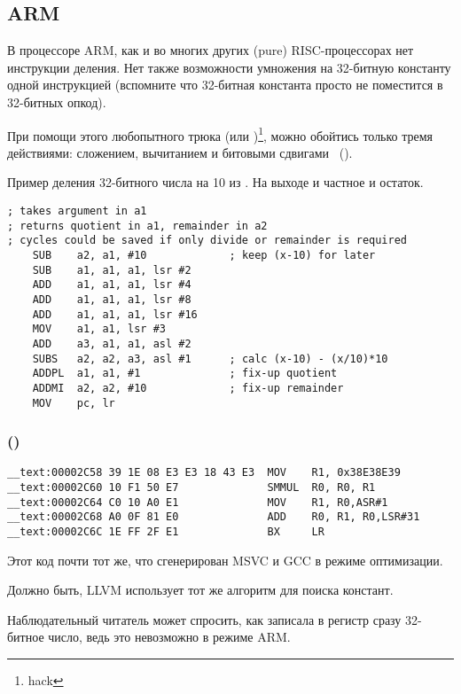 ﻿\subsection{ARM}

В процессоре ARM, как и во многих других  (pure) RISC-процессорах нет инструкции деления.
Нет также возможности умножения на 32-битную константу одной инструкцией (вспомните что 32-битная
константа просто не поместится в 32-битных опкод).

При помощи этого любопытного трюка (или )\footnote{hack}, можно обойтись только тремя действиями: 
сложением, вычитанием и битовыми сдвигами
~().

Пример деления 32-битного числа на 10 из
.
На выходе и частное и остаток.

\begin{lstlisting}[style=customasm]
; takes argument in a1
; returns quotient in a1, remainder in a2
; cycles could be saved if only divide or remainder is required
    SUB    a2, a1, #10             ; keep (x-10) for later
    SUB    a1, a1, a1, lsr #2
    ADD    a1, a1, a1, lsr #4
    ADD    a1, a1, a1, lsr #8
    ADD    a1, a1, a1, lsr #16
    MOV    a1, a1, lsr #3
    ADD    a3, a1, a1, asl #2
    SUBS   a2, a2, a3, asl #1      ; calc (x-10) - (x/10)*10
    ADDPL  a1, a1, #1              ; fix-up quotient
    ADDMI  a2, a2, #10             ; fix-up remainder
    MOV    pc, lr
\end{lstlisting}

\subsubsection{\OptimizingXcodeIV (\ARMMode)}

\begin{lstlisting}[style=customasm]
__text:00002C58 39 1E 08 E3 E3 18 43 E3  MOV    R1, 0x38E38E39
__text:00002C60 10 F1 50 E7              SMMUL  R0, R0, R1
__text:00002C64 C0 10 A0 E1              MOV    R1, R0,ASR#1
__text:00002C68 A0 0F 81 E0              ADD    R0, R1, R0,LSR#31
__text:00002C6C 1E FF 2F E1              BX     LR
\end{lstlisting}

Этот код почти тот же, что сгенерирован MSVC и GCC в режиме оптимизации.

Должно быть, LLVM использует тот же алгоритм для поиска констант.

Наблюдательный читатель может спросить, как \MOV записала в регистр сразу 32-битное число, 
ведь это невозможно в режиме ARM.

